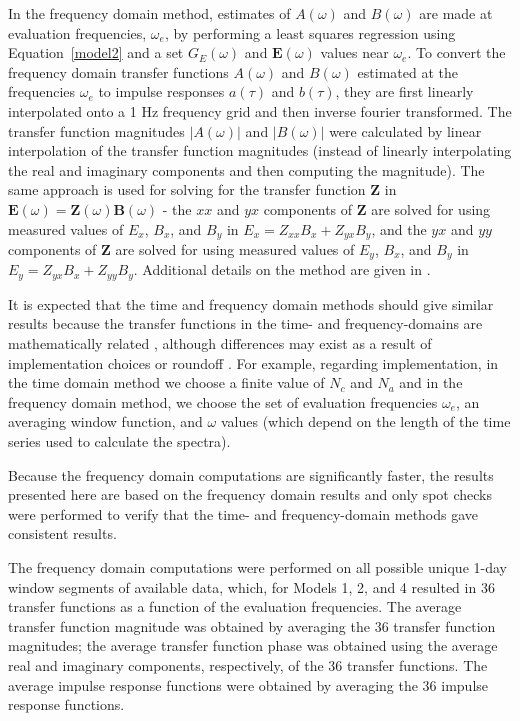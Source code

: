 \documentclass[draft,linenumbers]{agujournal2018}
\begin{document}
In the frequency domain method, estimates of $A(\omega)$ and $B(\omega)$ are made at evaluation frequencies, $\omega_e$, by performing a least squares regression using Equation~\ref{model2} and a set $G_E(\omega)$ and $\mathbf{E}(\omega)$ values near $\omega_e$. To convert the frequency domain transfer functions $A(\omega)$ and $B(\omega)$ estimated at the frequencies $\omega_e$ to impulse responses $a(\tau)$ and $b(\tau)$, they are first linearly interpolated onto a 1 Hz frequency grid and then inverse fourier transformed. The transfer function magnitudes $|A(\omega)|$ and $|B(\omega)|$ were calculated by linear interpolation of the transfer function magnitudes (instead of linearly interpolating the real and imaginary components and then computing the magnitude). The same approach is used for solving for the transfer function $\mathbf{Z}$ in $\mathbf{E}(\omega) = \mathbf{Z}(\omega)\mathbf{B}(\omega)$ - the $xx$ and $yx$ components of $\mathbf{Z}$ are solved for using measured values of $E_x$, $B_x$, and $B_y$ in $E_x = Z_{xx}B_x + Z_{yx}B_{y}$, and the $yx$ and $yy$ components of $\mathbf{Z}$ are solved for using measured values of $E_y$, $B_x$, and $B_y$ in $E_y = Z_{yx}B_x + Z_{yy}B_y$. Additional details on the method are given in \citep[and references therein.][]{Weigel2017}.

It is expected that the time and frequency domain methods should give similar results because the transfer functions in the time- and frequency-domains are mathematically related \citep{Schoukens2004,Ljung2007}, although differences may exist as a result of implementation choices or roundoff \citep{Ljung2004}.  For example, regarding implementation, in the time domain method we choose a finite value of $N_c$ and $N_a$ and in the frequency domain method, we choose the set of evaluation frequencies $\omega_e$, an averaging window function, and $\omega$ values (which depend on the length of the time series used to calculate the spectra).

Because the frequency domain computations are significantly faster, the results presented here are based on the frequency domain results and only spot checks were performed to verify that the time- and frequency-domain methods gave consistent results.

The frequency domain computations were performed on all possible unique 1-day window segments of available data, which, for Models 1, 2, and 4 resulted in 36 transfer functions as a function of the evaluation frequencies. The average transfer function magnitude was obtained by averaging the 36 transfer function magnitudes; the average transfer function phase was obtained using the average real and imaginary components, respectively, of the 36 transfer functions. The average impulse response functions were obtained by averaging the 36 impulse response functions.
\end{document}
